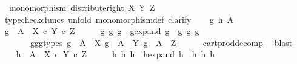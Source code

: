 \begin{isabellebody}
\ \ {\isachardoublequoteopen}monomorphism\ {\isacharparenleft}{\kern0pt}distribute{\isacharunderscore}{\kern0pt}right\ X\ Y\ Z{\isacharparenright}{\kern0pt}{\isachardoublequoteclose}\isanewline
%
\isadelimproof
%
\endisadelimproof
%
\isatagproof
{}\isamarkupfalse%
\ {\isacharparenleft}{\kern0pt}typecheck{\isacharunderscore}{\kern0pt}cfuncs{\isacharcomma}{\kern0pt}\ unfold\ monomorphism{\isacharunderscore}{\kern0pt}def{}{\isacharcomma}{\kern0pt}\ clarify{\isacharparenright}{\kern0pt}\isanewline
\ \ \isamarkupfalse%
\ g\ h\ A\isanewline
\ \ \isamarkupfalse%
\ {\isachardoublequoteopen}g\ {\isacharcolon}{\kern0pt}\ A\ {\isasymrightarrow}\ {\isacharparenleft}{\kern0pt}X\ {\isasymtimes}\isactrlsub c\ Y{\isacharparenright}{\kern0pt}\ {\isasymtimes}\isactrlsub c\ Z{\isachardoublequoteclose}\isanewline
\ \ \isamarkupfalse%
\ \isamarkupfalse%
\ g{}\ g{}\ g{}\ \ g{\isacharunderscore}{\kern0pt}expand{\isacharcolon}{\kern0pt}\ {\isachardoublequoteopen}g\ {\isacharequal}{\kern0pt}\ {\isasymlangle}{\isasymlangle}g{}{\isacharcomma}{\kern0pt}\ g{}{\isasymrangle}{\isacharcomma}{\kern0pt}\ g{}{\isasymrangle}{\isachardoublequoteclose}\isanewline
\ \ \ \ \ \ \ g{}{\isacharunderscore}{\kern0pt}g{}{\isacharunderscore}{\kern0pt}g{}{\isacharunderscore}{\kern0pt}types{\isacharcolon}{\kern0pt}\ {\isachardoublequoteopen}g{}\ {\isacharcolon}{\kern0pt}\ A\ {\isasymrightarrow}\ X{\isachardoublequoteclose}\ {\isachardoublequoteopen}g{}\ {\isacharcolon}{\kern0pt}\ A\ {\isasymrightarrow}\ Y{\isachardoublequoteclose}\ {\isachardoublequoteopen}g{}\ {\isacharcolon}{\kern0pt}\ A\ {\isasymrightarrow}\ Z{\isachardoublequoteclose}\isanewline
\ \ \ \ \isamarkupfalse%
\ cart{\isacharunderscore}{\kern0pt}prod{\isacharunderscore}{\kern0pt}decomp\ \isamarkupfalse%
\ blast\ \isanewline
\ \ \isamarkupfalse%
\ {\isachardoublequoteopen}h\ {\isacharcolon}{\kern0pt}\ A\ {\isasymrightarrow}\ {\isacharparenleft}{\kern0pt}X\ {\isasymtimes}\isactrlsub c\ Y{\isacharparenright}{\kern0pt}\ {\isasymtimes}\isactrlsub c\ Z{\isachardoublequoteclose}\isanewline
\ \ \isamarkupfalse%
\ \isamarkupfalse%
\ h{}\ h{}\ h{}\ \ h{\isacharunderscore}{\kern0pt}expand{\isacharcolon}{\kern0pt}\ {\isachardoublequoteopen}h\ {\isacharequal}{\kern0pt}\ {\isasymlangle}{\isasymlangle}h{}{\isacharcomma}{\kern0pt}\ h{}{\isasymrangle}{\isacharcomma}{\kern0pt}\ h{}{\isasymrangle}{\isachardoublequoteclose}\isanewline

\end{isabellebody}

